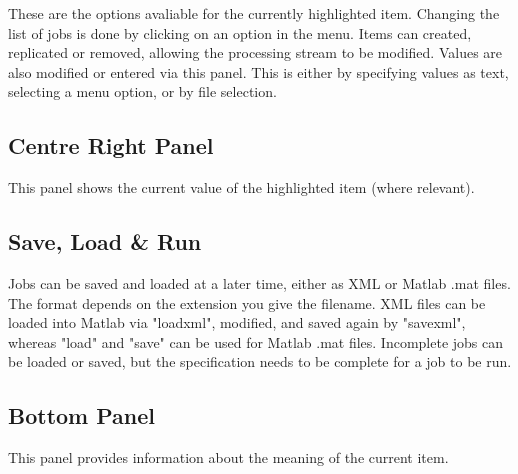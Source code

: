 \documentclass[a4paper,titlepage]{book}
\begin{document}
These are the options avaliable for the currently highlighted item. Changing the list of jobs is done by clicking on an option in the menu. Items can created, replicated or removed, allowing the processing stream to be modified. Values are also modified or entered via this panel. This is either by specifying values as text, selecting a menu option, or by file selection.


\subsection*{Centre Right Panel}

This panel shows the current value of the highlighted item (where relevant).


\subsection*{Save, Load \& Run}

Jobs can be saved and loaded at a later time, either as XML or Matlab .mat files.  The format depends on the extension you give the filename. XML files can be loaded into Matlab via "loadxml", modified, and saved again by "savexml", whereas "load" and "save" can be used for Matlab .mat files. Incomplete jobs can be loaded or saved, but the specification needs to be complete for a job to be run.


\subsection*{Bottom Panel}

This panel provides information about the meaning of the current item.
\end{document}
